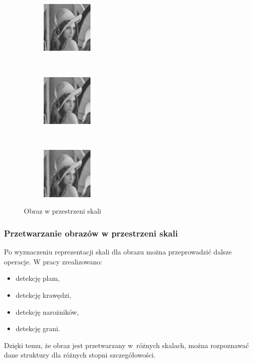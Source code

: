 \begin{frame}
\begin{figure}[h]
\begin{center}
		 
\begin{subfigure}[b]{2.5cm}
                 \centering
                 \includegraphics[width=2.5cm]{Lena_scales4.jpg}
         \end{subfigure}%
		 ~
		 \begin{subfigure}[b]{2.5cm}
                 \centering
                 \includegraphics[width=2.5cm]{Lena_scales5.jpg}
         \end{subfigure}%
		 ~
\begin{subfigure}[b]{2.5cm}
                 \centering
                 \includegraphics[width=2.5cm]{Lena_scales6.jpg}
         \end{subfigure}%
\caption{Obraz w przestrzeni skali}
\label{lena_scales}
\end{center}
\end{figure}
\end{frame}


\begin{frame}
\frametitle{Przetwarzanie obrazów w przestrzeni skali}

Po wyznaczeniu reprezentacji skali dla obrazu można przeprowadzić dalsze operacje. W pracy zrealizowano:
\begin{itemize}
\item detekcję plam,
\item detekcję krawędzi,
\item detekcję narożników,
\item detekcję grani.
\end{itemize}
Dzięki temu, że obraz jest przetwarzany w~różnych skalach, można rozpoznawać dane struktury dla różnych stopni szczegółowości.
\end{frame}

